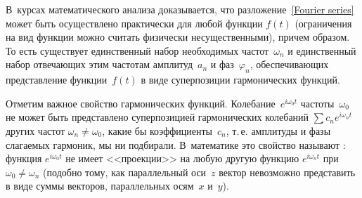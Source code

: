 В~курсах математического анализа доказывается, что
разложение~\eqref{Fourier series} может быть осуществлено 
практически для любой функции $f(t)$
(ограничения на вид функции можно считать физически несущественными), 
причем  образом.
То есть существует единственный набор необходимых частот~$\omega_n$ и
единственный набор отвечающих этим частотам амплитуд~$a_n$ и фаз~$\varphi_n$,
обеспечивающих представление функции~$f(t)$ в виде суперпозиции гармонических
функций. 

\begin{lab:note}
Отметим важное свойство гармонических функций.
Колебание~$e^{i\omega_0 t}$ частоты~$\omega_0$ не может быть
представлено суперпозицией гармонических колебаний $\sum c_n e^{i\omega_n t}$
других частот $\omega_n\ne\omega_0$, какие бы коэффициенты~$c_n$, т.\,е.
амплитуды и фазы слагаемых гармоник, мы ни подбирали. В~математике это
свойство называют : функция $e^{i\omega_0 t}$
не имеет <<проекции>> на любую другую функцию $e^{i\omega_nt}$ при
$\omega_0\ne\omega_n$ (подобно тому, как параллельный оси~$z$ вектор
невозможно представить в виде суммы векторов, параллельных осям~$x$ и~$y$).
\end{lab:note}

